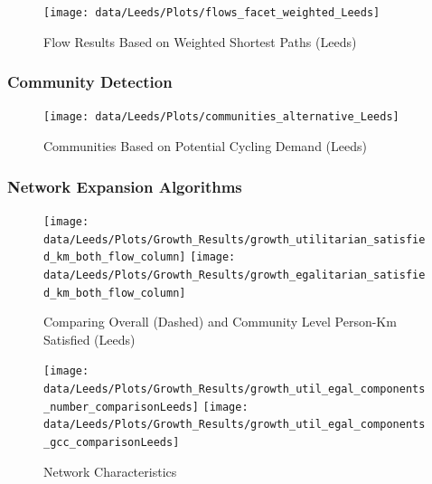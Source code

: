 \documentclass[
]{article}
\begin{document}
\begin{figure}

{\centering \texttt{[image: data/Leeds/Plots/flows\_facet\_weighted\_Leeds]} 

}

\caption{Flow Results Based on Weighted Shortest Paths (Leeds)}\label{fig:flowsfacetweightedLeeds}
\end{figure}

\clearpage

\subsubsection{Community Detection}

\begin{figure}

{\centering \texttt{[image: data/Leeds/Plots/communities\_alternative\_Leeds]} 

}

\caption{Communities Based on Potential Cycling Demand (Leeds)}\label{fig:communitiesLeeds}
\end{figure}

\subsubsection{Network Expansion Algorithms}

\begin{figure}[H]

{\centering \texttt{[image: data/Leeds/Plots/Growth\_Results/growth\_utilitarian\_satisfied\_km\_both\_flow\_column]} \texttt{[image: data/Leeds/Plots/Growth\_Results/growth\_egalitarian\_satisfied\_km\_both\_flow\_column]} 

}

\caption{Comparing Overall (Dashed) and Community Level Person-Km Satisfied (Leeds)}\label{fig:growthtotalLeeds}
\end{figure}

\begin{figure}[H]

{\centering \texttt{[image: data/Leeds/Plots/Growth\_Results/growth\_util\_egal\_components\_number\_comparisonLeeds]} \texttt{[image: data/Leeds/Plots/Growth\_Results/growth\_util\_egal\_components\_gcc\_comparisonLeeds]} 

}

\caption{Network Characteristics}\label{fig:componentsandGCCLeeds}
\end{figure}
\end{document}
